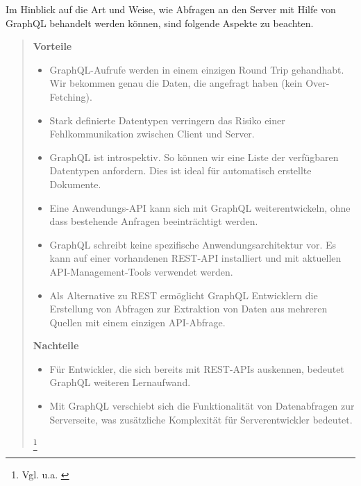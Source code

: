 Im Hinblick auf die Art und Weise, wie Abfragen an den Server mit Hilfe von \\ GraphQL behandelt werden können, sind folgende Aspekte zu beachten.
\\
\begin{quote}
    \textbf{Vorteile}\\

    \begin{itemize}
        \item
              GraphQL-Aufrufe werden in einem einzigen Round Trip gehandhabt. Wir bekommen genau die Daten, die angefragt haben (kein Over-Fetching).

        \item
              Stark definierte Datentypen verringern das Risiko einer Fehlkommunikation zwischen Client und Server.

        \item
              GraphQL ist introspektiv. So können wir eine Liste der verfügbaren Datentypen anfordern. Dies ist ideal für automatisch erstellte Dokumente.

        \item
              Eine Anwendungs-API kann sich mit GraphQL weiterentwickeln, ohne dass bestehende Anfragen beeinträchtigt werden.
        \item
              GraphQL schreibt keine spezifische Anwendungsarchitektur vor. Es kann auf einer vorhandenen REST-API installiert und mit aktuellen API-Management-Tools verwendet werden.
        \item
              Als Alternative zu REST ermöglicht GraphQL Entwicklern die Erstellung von Abfragen zur Extraktion von Daten aus mehreren Quellen mit einem einzigen API-Abfrage.

    \end{itemize}
   
    \textbf{Nachteile}
    \begin{itemize}
        \item
        Für Entwickler, die sich bereits mit REST-APIs auskennen, bedeutet GraphQL weiteren Lernaufwand.
     \item 
     Mit GraphQL verschiebt sich die Funktionalität von Datenabfragen zur Serverseite, was zusätzliche Komplexität für Serverentwickler bedeutet.

\end{itemize}

    \footnote{Vgl. u.a. \cite{RH1}}
\end{quote}

